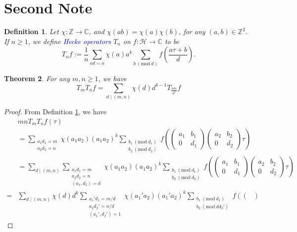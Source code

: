 \documentclass{article}
\newtheorem{theorem}{Theorem}
\newtheorem{definition}[theorem]{Definition}
\newcommand{\Mod}[1]{\ (\mathrm{mod}\ #1)}
\begin{document}
\section{Second Note}
\begin{definition}\label{def 1}
    Let $\chi:\mathbb{Z}\to\mathbb{C}$, and $\chi(ab)=\chi(a)\chi(b)$, for any $(a,b)\in \mathbb{Z}^2$. If $n\geq 1$, we define \textcolor{blue}{Hecke operators} $T_n$ on $f:\mathcal{H}\to \mathbb{C}$ to be
    \[T_nf:=\frac{1}{n}\sum_{ad=n}\chi(a)a^k\sum_{b\Mod{d}}f(\frac{a\tau+b}{d}).\]
\end{definition}
\begin{theorem}
    For any $m,n\geq 1$, we have \[T_mT_nf=\sum_{d\mid (m,n)}\chi(d)d^{k-1}T_{\frac{mn}{d^2}}f\]
\end{theorem}
\begin{proof}
    From Definition \ref{def 1}, we have 
    \begin{equation}
        \begin{aligned}
            &mnT_mT_nf(\tau)\\
            &=\sum_{\substack{a_1d_1=m\\a_2d_2=n}}\chi(a_1a_2)(a_1a_2)^k \sum_{\substack{b_1\Mod{d_1}\\b_2\Mod{d_2}}}f\left(\begin{pmatrix}
            a_1&b_1\\
            0&d_1
        \end{pmatrix}
        \begin{pmatrix}
            a_2&b_2\\
            0&d_2
        \end{pmatrix}\tau\right)\\
        &=\sum_{d\mid (m,n)}\sum_{\substack{a_1d_1=m\\a_2d_2=n\\(a_1,d_2)=d}}\chi(a_1a_2)(a_1a_2)^k \sum_{\substack{b_1\Mod{d_1}\\b_2\Mod{d_2}}}f\left(\begin{pmatrix}
            a_1&b_1\\
            0&d_1
        \end{pmatrix}
        \begin{pmatrix}
            a_2&b_2\\
            0&d_2
        \end{pmatrix}\tau\right)\\
        =&\sum_{d\mid (m,n)}\chi(d)d^k\sum_{\substack{a_1'd_1=m/d\\a_2d_2'=n/d\\(a_1',d_2')=1}}\chi(a_1'a_2)(a_1'a_2)^k \sum_{\substack{b_1\Mod{d_1}\\b_2\Mod{d d_2'}}}f\left(\begin{pmatrix}

\end{pmatrix}
\end{aligned}
\end{equation}
\end{proof}
\end{document}
